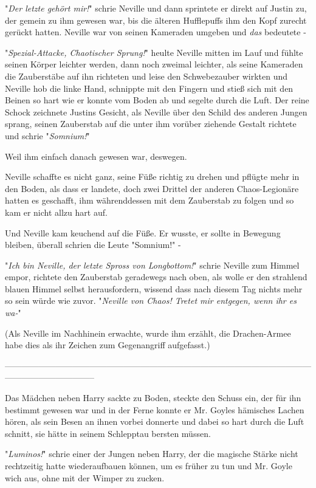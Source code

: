 {"\emph{Der letzte gehört mir!}" schrie Neville und dann sprintete er direkt auf Justin zu, der gemein zu ihm gewesen war, bis die älteren Hufflepuffs ihm den Kopf zurecht gerückt hatten. Neville war von seinen Kameraden umgeben und \emph{das} bedeutete -

"\emph{Spezial-Attacke, Chaotischer Sprung!}" heulte Neville mitten im Lauf und fühlte seinen Körper leichter werden, dann noch zweimal leichter, als seine Kameraden die Zauberstäbe auf ihn richteten und leise den Schwebezauber wirkten und Neville hob die linke Hand, schnippte mit den Fingern und stieß sich mit den Beinen so hart wie er konnte vom Boden ab und segelte durch die Luft. Der reine Schock zeichnete Justins Gesicht, als Neville über den Schild des anderen Jungen sprang, seinen Zauberstab auf die unter ihm vorüber ziehende Gestalt richtete und schrie "\emph{Somnium!}"

Weil ihm einfach danach gewesen war, deswegen.

Neville schaffte es nicht ganz, seine Füße richtig zu drehen und pflügte mehr in den Boden, als dass er landete, doch zwei Drittel der anderen Chaos-Legionäre hatten es geschafft, ihm währenddessen mit dem Zauberstab zu folgen und so kam er nicht allzu hart auf.

Und Neville kam keuchend auf die Füße. Er wusste, er sollte in Bewegung bleiben, überall schrien die Leute "Somnium!" -

"\emph{Ich bin Neville, der letzte Spross von Longbottom!}" schrie Neville zum Himmel empor, richtete den Zauberstab geradewegs nach oben, als wolle er den strahlend blauen Himmel selbst herausfordern, wissend dass nach diesem Tag nichts mehr so sein würde wie zuvor. "\emph{Neville von Chaos! Tretet mir entgegen, wenn ihr es wa-}"

(Als Neville im Nachhinein erwachte, wurde ihm erzählt, die Drachen-Armee habe dies als ihr Zeichen zum Gegenangriff aufgefasst.)

--------------------------------------------------------------------------------------------------------------------------------------------

Das Mädchen neben Harry sackte zu Boden, steckte den Schuss ein, der für ihn bestimmt gewesen war und in der Ferne konnte er Mr. Goyles hämisches Lachen hören, als sein Besen an ihnen vorbei donnerte und dabei so hart durch die Luft schnitt, sie hätte in seinem Schlepptau bersten müssen.

"\emph{Luminos!}" schrie einer der Jungen neben Harry, der die magische Stärke nicht rechtzeitig hatte wiederaufbauen können, um es früher zu tun und Mr. Goyle wich aus, ohne mit der Wimper zu zucken.

}
